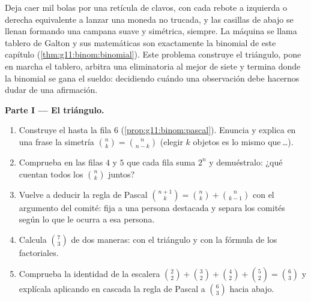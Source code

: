 \begin{problem}
\label{pb:g11:binom:1}
Deja caer mil bolas por una retícula de clavos, con cada rebote a
izquierda o derecha equivalente a lanzar una moneda no trucada, y las
casillas de abajo se llenan formando una campana suave y simétrica, siempre.
La máquina se llama tablero de Galton y sus matemáticas son exactamente la
 binomial de este capítulo
(\cref{thm:g11:binom:binomial}). Este problema construye el triángulo, pone
en marcha el tablero, arbitra una eliminatoria al mejor de siete y termina
donde la binomial se gana el sueldo: decidiendo cuándo una observación
debe hacernos dudar de una afirmación.

\medskip
\noindent\textbf{Parte I --- El triángulo.}
\begin{enumerate}
  \item Construye el  hasta la fila $6$
        (\cref{prop:g11:binom:pascal}). Enuncia y explica en una frase la
        simetría $\binom nk = \binom{n}{n-k}$ (elegir $k$ objetos es lo
        mismo que\,\dots).
  \item Comprueba en las filas $4$ y $5$ que cada fila suma $2^n$ y
        demuéstralo: ¿qué cuentan todos los $\binom nk$ juntos?
  \item Vuelve a deducir la regla de Pascal
        $\binom{n+1}{k} = \binom nk + \binom{n}{k-1}$ con el argumento del
        comité: fija a una persona destacada y separa los comités según lo
        que le ocurra a esa persona.
  \item Calcula $\binom73$ de dos maneras: con el triángulo y con la
        fórmula de los factoriales.
  \item Comprueba la identidad de la escalera
        $\binom22 + \binom32 + \binom42 + \binom52 = \binom63$ y
        explícala aplicando en cascada la regla de Pascal a $\binom63$
        hacia abajo.
\end{enumerate}


\end{problem}
